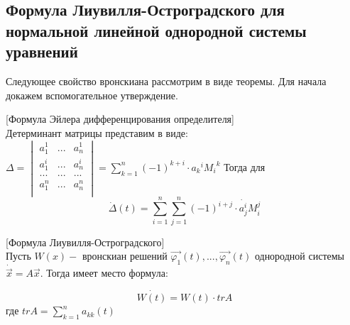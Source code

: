 



\subsection*{Формула Лиувилля-Остроградского для нормальной линейной однородной системы уравнений}

Следующее свойство вронскиана рассмотрим в виде теоремы. Для начала докажем вспомогательное утверждение.

\begin{lemma}

[Формула Эйлера дифференцирования определителя]\\
Детерминант матрицы представим в виде: 
$\Delta = 
\begin{vmatrix}
  a_1^1 & ... & a_n^1 \\
  a_1^i & ... & a_n^i \\
  ...   & ... & ...   \\
  a_1^n & ... & a_n^n \\
\end{vmatrix} = \sum\limits_{k = 1}^n{(-1)^{k + i} \cdot {a_k}^i {M_i}^k}
$
Тогда для 
\[\dot{\Delta}(t) = \sum\limits_{i = 1}^n{\sum\limits_{j = 1}^n{(-1)^{i + j} \cdot \dot{a_j^i}}M_i^j}\]

\end{lemma}

\begin{theorem}

[Формула Лиувилля-Остроградского]\\
Пусть $W(x) - $ вронскиан решений $\vec{\varphi_1}(t), ..., \vec{\varphi_n}(t)$ однородной системы $\dot{\vec{x}} = A\vec{x}$. Тогда имеет место формула:

\[\dot{W(t)} = W(t) \cdot trA\]
где $trA = \sum\limits_{k = 1}^n{a_{kk}(t)}$

\end{theorem}

